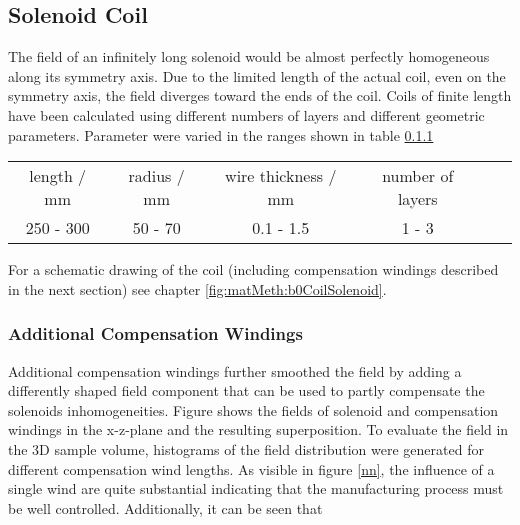         \subsection{Solenoid Coil}
        The field of an infinitely long solenoid would be almost perfectly homogeneous along its symmetry axis. Due to the limited length of the actual coil, even on the symmetry axis, the field diverges toward the ends of the coil. Coils of finite length have been calculated using different numbers of layers and different geometric parameters. Parameter were varied in the ranges shown in table \ref{}
        \begin{table}
            \centering
            \begin{tabular}{cccccc}
                length / mm & radius / mm & wire thickness / mm & number of layers \\
                250 - 300 & 50 - 70 & 0.1 - 1.5 & 1 - 3
            \end{tabular}
        \end{table}
        For a schematic drawing of the coil (including compensation windings described in the next section) see chapter \ref{fig:matMeth:b0CoilSolenoid}.

        \subsubsection{Additional Compensation Windings}
            Additional compensation windings further smoothed the field by adding a differently shaped field component that can be used to partly compensate the solenoids inhomogeneities. Figure  shows the fields of solenoid and compensation windings in the x-z-plane and the resulting superposition.
            To evaluate the field in the 3D sample volume, histograms of the field distribution were generated for different compensation wind lengths. As visible in figure \ref{nn}, the influence of a single wind are quite substantial indicating that the manufacturing process must be well controlled. Additionally, it can be seen that

